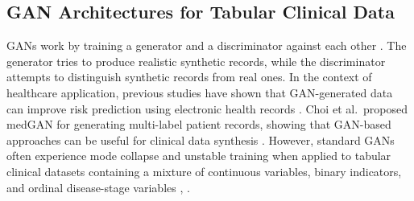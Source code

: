 \subsection{GAN Architectures for Tabular Clinical Data}

GANs work by training a generator and a discriminator against each other \cite{vega2020}. The generator tries to produce realistic synthetic records, while the discriminator attempts to distinguish synthetic records from real ones. In the context of healthcare application, previous studies have shown that GAN-generated data can improve risk prediction using electronic health records \cite{che2017}. Choi et al.\ proposed medGAN for generating multi-label patient records, showing that GAN-based approaches can be useful for clinical data synthesis \cite{choi2017}. However, standard GANs often experience mode collapse and unstable training when applied to tabular clinical datasets containing a mixture of continuous variables, binary indicators, and ordinal disease-stage variables \cite{lenz2021}, \cite{espinosa2023}.


%
%

